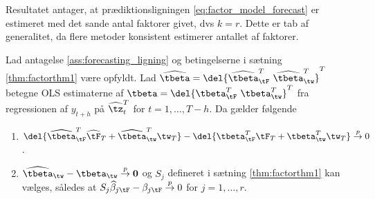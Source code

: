 Resultatet antager, at prædiktionsligningen \eqref{eq:factor_model_forecast} er estimeret med det sande antal faktorer givet, dvs \(k=r\).
Dette er tab af generalitet, da flere metoder konsistent estimerer antallet af faktorer.
%
\newpage
\begin{thm} \label{thm:factorthm2}
Lad antagelse \ref{ass:forecasting_ligning} og betingelserne i sætning \ref{thm:factorthm1} være opfyldt. 
Lad \(\widehat{\tbeta} =\del{
\widehat{\tbeta}_{\tF}^T \ \widehat{\tbeta}_{\tw}^T}^T\) betegne OLS estimaterne af  \(\tbeta =\del{
\tbeta_{\tF}^T \ \tbeta_{\tw}^T}^T\) fra regressionen af \(y_{t+h}\) på \(\widehat{\tz}_t^T\) for \(t=1, \ldots, T-h\).
Da gælder følgende
\begin{enumerate}[label=\alph*)]
\item \(\del{\widehat{\tbeta}_{\tF}^T \widehat{\tF}_T + \widehat{\tbeta}^T_{\tw} \tw_T} - \del{\tbeta_{\tF}^T \tF_T + \tbeta_{\tw}^T \tw_T} \overset{p}{\rightarrow} 0\).
\item \(\widehat{\tbeta}_{\tw} - \tbeta_{\tw} \overset{p}{\rightarrow} \mathbf{0}\) og \(S_j\) defineret i sætning \ref{thm:factorthm1} kan vælges, således at \(S_j \widehat{\beta}_{j \tF} - \beta_{j \tF} \overset{p}{\rightarrow} 0\) for \(j = 1, \ldots, r\).
\end{enumerate}
\end{thm}
%
